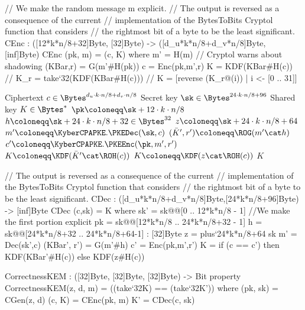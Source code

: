 \begin{code}
  // We make the random message m explicit.
  // The output is reversed as a consequence of the current
  // implementation of the BytesToBits Cryptol function that considers
  // the rightmost bit of a byte to be the least significant.
  CEnc : ([12*k*n/8+32]Byte, [32]Byte) -> ([d_u*k*n/8+d_v*n/8]Byte, [inf]Byte)
  CEnc (pk, m) = (c, K) where
    m' = H(m) // Cryptol warns about shadowing
    (KBar,r) = G(m'#H(pk))
    c = Enc(pk,m',r)
    K = KDF(KBar#H(c))
    // K_r = take`{32}(KDF(KBar#H(c)))
    // K = [reverse (K_r@(i)) | i <- [0 .. 31]]
\end{code}

\begin{algorithm}
  \caption{$\KyberCCAKEM.\KEMDec(c,\sk)$\label{alg:ccadec}}
  \begin{algorithmic}[1]
    \Require Ciphertext $c \in \Bytes^{d_u\cdot k\cdot n/8 + d_v\cdot n/8}$
    \Require Secret key $\sk \in \Bytes^{24\cdot k\cdot n/8 + 96}$
    \Ensure Shared key $K \in \Bytes^*$
    \State $\pk \coloneqq \sk+12\cdot k\cdot n/8$
    \State $h \coloneqq \sk+24\cdot k\cdot n/8 + 32 \in \Bytes^{32}$
    \State $z \coloneqq \sk+24\cdot k\cdot n/8 + 64$
    \State $m'\coloneqq \KyberCPAPKE.\PKEDec(\sk,c)$
    \State $(\bar{K}',r') \coloneqq \ROG(m'\cat h)$
    \State $c' \coloneqq \KyberCPAPKE.\PKEEnc(\pk, m', r')$
      \State \Return $K \coloneqq \KDF(\bar{K}'\cat \ROH(c))$
    \Else
      \State \Return $K \coloneqq \KDF(z\cat \ROH(c))$
    \EndIf 
    \State \Return $K$
  \end{algorithmic}
\end{algorithm}

\begin{code}
  // The output is reversed as a consequence of the current
  // implementation of the BytesToBits Cryptol function that considers
  // the rightmost bit of a byte to be the least significant.
  CDec : ([d_u*k*n/8+d_v*n/8]Byte,[24*k*n/8+96]Byte) -> [inf]Byte
  CDec (c,sk) = K
    where
      sk' = sk@@[0 .. 12*k*n/8 - 1] //We make the first portion explicit
      pk = sk@@[12*k*n/8 .. 24*k*n/8+32 - 1]
      h = sk@@[24*k*n/8+32 .. 24*k*n/8+64-1] : [32]Byte
      z = plus`{24*k*n/8+64} sk
      m' = Dec(sk',c)
      (KBar', r') = G(m'#h)
      c' = Enc(pk,m',r')
      K = if (c == c') then KDF(KBar'#H(c))
                       else KDF(z#H(c))


  CorrectnessKEM : ([32]Byte, [32]Byte, [32]Byte) -> Bit
  property CorrectnessKEM(z, d, m) = ((take`{32}K) == (take`{32}K')) where
    (pk, sk) = CGen(z, d)
    (c, K) = CEnc(pk, m)
    K' = CDec(c, sk)
\end{code}

